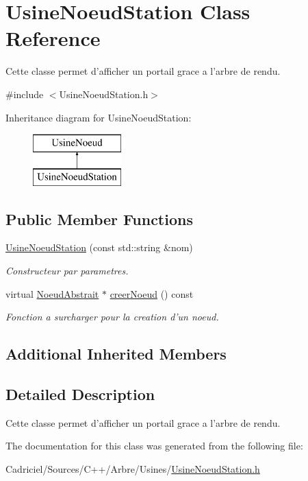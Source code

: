 \hypertarget{class_usine_noeud_station}{\section{Usine\-Noeud\-Station Class Reference}
\label{class_usine_noeud_station}
}


Cette classe permet d'afficher un portail grace a l'arbre de rendu.  




{\ttfamily \#include $<$Usine\-Noeud\-Station.\-h$>$}

Inheritance diagram for Usine\-Noeud\-Station\-:\begin{figure}[H]
\begin{center}
\leavevmode
\includegraphics[height=2.000000cm]{class_usine_noeud_station}
\end{center}
\end{figure}
\subsection*{Public Member Functions}
\begin{DoxyCompactItemize}
\item 
\hyperlink{group__inf2990_ga2764ea906a40cc5c5c42748dd1a56d7c}{Usine\-Noeud\-Station} (const std\-::string \&nom)
\begin{DoxyCompactList}\small\item\em Constructeur par parametres. \end{DoxyCompactList}\item 
virtual \hyperlink{class_noeud_abstrait}{Noeud\-Abstrait} $\ast$ \hyperlink{group__inf2990_gabc547440a5120276ecaf2a334186a602}{creer\-Noeud} () const 
\begin{DoxyCompactList}\small\item\em Fonction a surcharger pour la creation d'un noeud. \end{DoxyCompactList}\end{DoxyCompactItemize}
\subsection*{Additional Inherited Members}


\subsection{Detailed Description}
Cette classe permet d'afficher un portail grace a l'arbre de rendu. 

The documentation for this class was generated from the following file\-:\begin{DoxyCompactItemize}
\item 
Cadriciel/\-Sources/\-C++/\-Arbre/\-Usines/\hyperlink{_usine_noeud_station_8h}{Usine\-Noeud\-Station.\-h}\end{DoxyCompactItemize}

